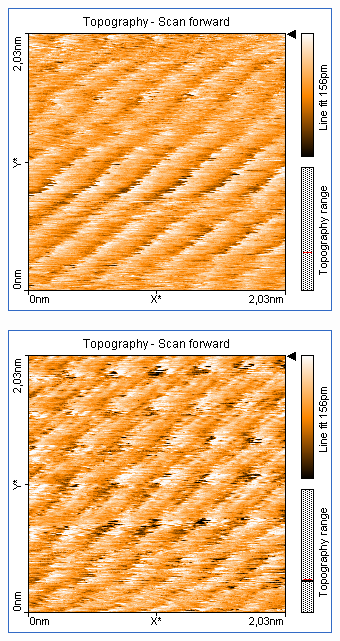 \begin{figure}
    \begin{subfigure}[b]{\picwidth}
        \includegraphics[width=\textwidth]{data/Graphit/pic_06_07_3nm}
        \caption{}
        \label{fig:graphit_06_07}
    \end{subfigure}\qquad
    \begin{subfigure}[b]{\picwidth}
        \includegraphics[width=\textwidth]{data/Graphit/pic_06_08_3nm}

\end{subfigure}
\end{figure}
